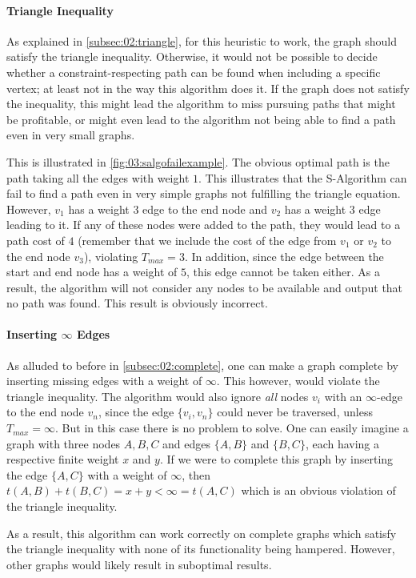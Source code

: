 \newpage
{}
\label{par:03:salgotriangle}
\paragraph{Triangle Inequality}
As explained in \cref{subsec:02:triangle}, for this heuristic to work, the graph should satisfy the triangle inequality.
Otherwise, it would not be possible to decide whether a constraint-respecting path can be found when including a specific vertex; at least not in the way this algorithm does it.
If the graph does not satisfy the inequality, this might lead the algorithm to miss pursuing paths that might be profitable,
or might even lead to the algorithm not being able to find a path even in very small graphs.

This is illustrated in \cref{fig:03:salgofailexample}. The obvious optimal path is the path taking all the edges with weight $1$. This illustrates that the S-Algorithm can fail to find a path even in very simple graphs not fulfilling the triangle equation.
However, $v_1$ has a weight $3$ edge to the end node and $v_2$ has a weight $3$ edge leading to it.
If any of these nodes were added to the path, they would lead to a path cost of $4$ (remember that we include the cost of the edge from $v_1$ or $v_2$ to the end node $v_3$), violating $T_{max} = 3$.
In addition, since the edge between the start and end node has a weight of $5$, this edge cannot be taken either.
As a result, the algorithm will not consider any nodes to be available and output that no path was found.
This result is obviously incorrect.

\paragraph{Inserting $\infty$ Edges}
As alluded to before in \cref{subsec:02:complete}, one can make a graph complete by inserting missing edges with a weight of $\infty$.
This however, would violate the triangle inequality.
The algorithm would also ignore \emph{all} nodes $v_i$ with an $\infty$-edge to the end node $v_n$, since the edge $\{v_i, v_n\}$ could never be traversed, unless $T_{max} = \infty$.
But in this case there is no problem to solve.
One can easily imagine a graph with three nodes $A, B, C$ and edges $\{A, B\}$ and $\{B, C\}$, each having a respective finite weight $x$ and $y$.
If we were to complete this graph by inserting the edge $\{A, C\}$ with a weight of $\infty$, then $t(A, B) + t(B,C) = x + y < \infty = t(A, C)$
which is an obvious violation of the triangle inequality.

As a result, this algorithm can work correctly on complete graphs which satisfy the triangle inequality with none of its functionality being hampered.
However, other graphs would likely result in suboptimal results.

